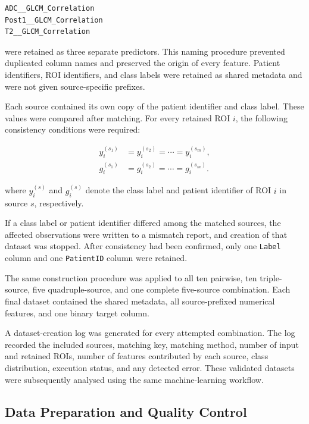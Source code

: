 \documentclass[12pt,twocolumn]{article}
\begin{document}
\begin{verbatim}
ADC__GLCM_Correlation
Post1__GLCM_Correlation
T2__GLCM_Correlation
\end{verbatim}

were retained as three separate predictors. This naming procedure
prevented duplicated column names and preserved the origin of every
feature. Patient identifiers, ROI identifiers, and class labels were
retained as shared metadata and were not given source-specific
prefixes.

Each source contained its own copy of the patient identifier and
class label. These values were compared after matching. For every
retained ROI \(i\), the following consistency conditions were
required:

\begin{equation}
\begin{aligned}
y_i^{(s_1)}
&=
y_i^{(s_2)}
=
\cdots
=
y_i^{(s_m)},
\\[3pt]
g_i^{(s_1)}
&=
g_i^{(s_2)}
=
\cdots
=
g_i^{(s_m)}.
\end{aligned}
\label{eq:multisource_consistency}
\end{equation}


where \(y_i^{(s)}\) and \(g_i^{(s)}\) denote the class label and
patient identifier of ROI \(i\) in source \(s\), respectively.

If a class label or patient identifier differed among the matched
sources, the affected observations were written to a mismatch report,
and creation of that dataset was stopped. After consistency had been
confirmed, only one \texttt{Label} column and one
\texttt{PatientID} column were retained.

The same construction procedure was applied to all ten pairwise,
ten triple-source, five quadruple-source, and one complete
five-source combination. Each final dataset contained the shared
metadata, all source-prefixed numerical features, and one binary
target column.

A dataset-creation log was generated for every attempted combination.
The log recorded the included sources, matching key, matching method,
number of input and retained ROIs, number of features contributed by
each source, class distribution, execution status, and any detected
error. These validated datasets were subsequently analysed using the
same machine-learning workflow.








\subsection{Data Preparation and Quality Control}
\label{subsec:data_quality_control}
\end{document}
